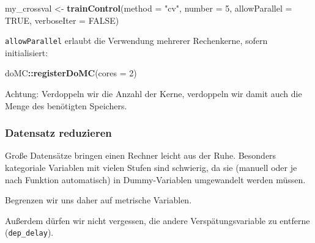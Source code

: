 \documentclass[]{article}
\newenvironment{Shaded}{\begin{snugshade}}{\end{snugshade}}
\newcommand{\DataTypeTok}[1]{\textcolor[rgb]{0.13,0.29,0.53}{#1}}
\newcommand{\DecValTok}[1]{\textcolor[rgb]{0.00,0.00,0.81}{#1}}
\newcommand{\KeywordTok}[1]{\textcolor[rgb]{0.13,0.29,0.53}{\textbf{#1}}}
\newcommand{\NormalTok}[1]{#1}
\newcommand{\OperatorTok}[1]{\textcolor[rgb]{0.81,0.36,0.00}{\textbf{#1}}}
\newcommand{\OtherTok}[1]{\textcolor[rgb]{0.56,0.35,0.01}{#1}}
\newcommand{\StringTok}[1]{\textcolor[rgb]{0.31,0.60,0.02}{#1}}
\begin{document}
\begin{Shaded}
\begin{Highlighting}[]
\NormalTok{my_crossval <-}\StringTok{ }\KeywordTok{trainControl}\NormalTok{(}\DataTypeTok{method =} \StringTok{"cv"}\NormalTok{,}
                            \DataTypeTok{number =} \DecValTok{5}\NormalTok{,}
                            \DataTypeTok{allowParallel =} \OtherTok{TRUE}\NormalTok{,}
                            \DataTypeTok{verboseIter =} \OtherTok{FALSE}\NormalTok{)}
\end{Highlighting}
\end{Shaded}

\texttt{allowParallel} erlaubt die Verwendung mehrerer Rechenkerne,
sofern initialisiert:

\begin{Shaded}
\begin{Highlighting}[]
\NormalTok{doMC}\OperatorTok{::}\KeywordTok{registerDoMC}\NormalTok{(}\DataTypeTok{cores =} \DecValTok{2}\NormalTok{)}
\end{Highlighting}
\end{Shaded}

Achtung: Verdoppeln wir die Anzahl der Kerne, verdoppeln wir damit auch
die Menge des benötigten Speichers.

\hypertarget{datensatz-reduzieren}{%
\subsubsection{Datensatz reduzieren}\label{datensatz-reduzieren}}

Große Datensätze bringen einen Rechner leicht aus der Ruhe. Besonders
kategoriale Variablen mit vielen Stufen sind schwierig, da sie (manuell
oder je nach Funktion automatisch) in Dummy-Variablen umgewandelt werden
müssen.

Begrenzen wir uns daher auf metrische Variablen.

\begin{Shaded}
\end{Shaded}

Außerdem dürfen wir nicht vergessen, die andere Verspätungsvariable zu
entferne (\texttt{dep\_delay}).

\begin{Shaded}
\end{Shaded}
\end{document}
